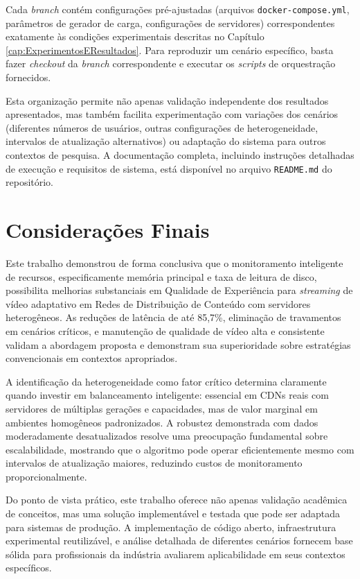 Cada \textit{branch} contém configurações pré-ajustadas (arquivos \texttt{docker-compose.yml}, parâmetros de gerador de carga, configurações de servidores) correspondentes exatamente às condições experimentais descritas no Capítulo \ref{cap:ExperimentosEResultados}. Para reproduzir um cenário específico, basta fazer \textit{checkout} da \textit{branch} correspondente e executar os \textit{scripts} de orquestração fornecidos.

Esta organização permite não apenas validação independente dos resultados apresentados, mas também facilita experimentação com variações dos cenários (diferentes números de usuários, outras configurações de heterogeneidade, intervalos de atualização alternativos) ou adaptação do sistema para outros contextos de pesquisa. A documentação completa, incluindo instruções detalhadas de execução e requisitos de sistema, está disponível no arquivo \texttt{README.md} do repositório.

\section{Considerações Finais}

Este trabalho demonstrou de forma conclusiva que o monitoramento inteligente de recursos, especificamente memória principal e taxa de leitura de disco, possibilita melhorias substanciais em Qualidade de Experiência para \textit{streaming} de vídeo adaptativo em Redes de Distribuição de Conteúdo com servidores heterogêneos. As reduções de latência de até 85,7\%, eliminação de travamentos em cenários críticos, e manutenção de qualidade de vídeo alta e consistente validam a abordagem proposta e demonstram sua superioridade sobre estratégias convencionais em contextos apropriados.

A identificação da heterogeneidade como fator crítico determina claramente quando investir em balanceamento inteligente: essencial em CDNs reais com servidores de múltiplas gerações e capacidades, mas de valor marginal em ambientes homogêneos padronizados. A robustez demonstrada com dados moderadamente desatualizados resolve uma preocupação fundamental sobre escalabilidade, mostrando que o algoritmo pode operar eficientemente mesmo com intervalos de atualização maiores, reduzindo custos de monitoramento proporcionalmente.

Do ponto de vista prático, este trabalho oferece não apenas validação acadêmica de conceitos, mas uma solução implementável e testada que pode ser adaptada para sistemas de produção. A implementação de código aberto, infraestrutura experimental reutilizável, e análise detalhada de diferentes cenários fornecem base sólida para profissionais da indústria avaliarem aplicabilidade em seus contextos específicos.

